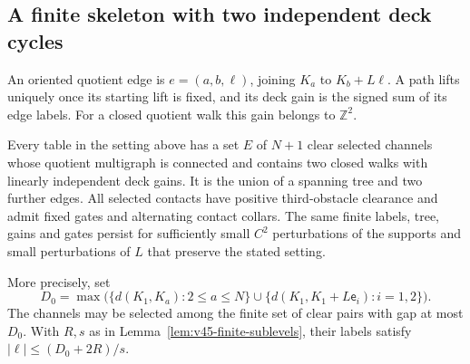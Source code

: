 \subsection{A finite skeleton with two independent deck cycles}

An oriented quotient edge is $e=(a,b,\ell)$, joining $K_a$ to $K_b+L\ell$.
A path lifts uniquely once its starting lift is fixed, and its deck gain is
the signed sum of its edge labels.  For a closed quotient walk this gain
belongs to $\mathbb Z^2$.

\begin{theorem}
\label{thm:v45-clear-skeleton}
Every table in the setting above has a set $E$ of $N+1$ clear selected
channels whose quotient multigraph is connected and contains two closed
walks with linearly independent deck gains.  It is the union of a spanning
tree and two further edges.  All selected contacts have positive
third-obstacle clearance and admit fixed gates and alternating contact
collars.  The same finite labels, tree, gains and gates persist for
sufficiently small $C^2$ perturbations of the supports and small perturbations
of $L$ that preserve the stated setting.

More precisely, set
\begin{equation}\label{eq:v45-seed-distance}
 D_0=\max\bigl(\{d(K_1,K_a):2\le a\le N\}
          \cup\{d(K_1,K_1+L\mathsf e_i):i=1,2\}\bigr).
\end{equation}
The channels may be selected among the finite set of clear pairs with gap
at most $D_0$.  With $R,s$ as in Lemma~\ref{lem:v45-finite-sublevels}, their
labels satisfy $|\ell|\le(D_0+2R)/s$.
\end{theorem}

